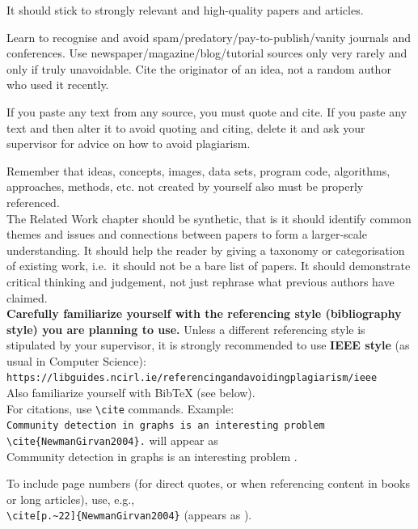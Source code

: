 \documentclass[a4paper,12pt]{Classes/RoboticsLaTeX}
\begin{document}
	It should stick to strongly relevant and high-quality papers and articles. 
	
	Learn to recognise and avoid spam/predatory/pay-to-publish/vanity journals and conferences. Use newspaper/magazine/blog/tutorial sources only very rarely and only if truly unavoidable. Cite the originator of an idea, not a random author who used it recently.
	
	If you paste any text from any source, you must quote and cite. If you paste any text and then alter it to avoid quoting and citing, delete it and ask your supervisor for advice on how to avoid plagiarism.
	
	Remember that ideas, concepts, images, data sets, program code, algorithms, approaches, methods, etc. not created by yourself also must be properly referenced. \\
	
	The Related Work chapter should be synthetic, that is it should identify common themes and issues and connections between papers to form a larger-scale understanding. It should help the reader by giving a taxonomy or categorisation of existing work, i.e.~it should not be a bare list of papers. It should demonstrate critical thinking and judgement, not just rephrase what previous authors have claimed. \\
	
	
	\textbf{Carefully familiarize yourself with the referencing style (bibliography style) you are planning to use.} Unless a different referencing style is stipulated by your supervisor, it is strongly recommended to use \textbf{IEEE style} (as usual in Computer Science):\\ \verb#https://libguides.ncirl.ie/referencingandavoidingplagiarism/ieee#\\
	
	\noindent Also familiarize yourself with BibTeX (see below).\\
	
	\noindent For citations, use \verb#\cite# commands. Example:\\
	\verb#Community detection in graphs is an interesting problem \cite{NewmanGirvan2004}.#
	will appear as\\
	Community detection in graphs is an interesting problem \cite{NewmanGirvan2004}.
	
	\noindent To include page numbers (for direct quotes, or when referencing content in books or long articles), use, e.g.,\\ \noindent \verb#\cite[p.~22]{NewmanGirvan2004}# (appears as \cite[p.~22]{NewmanGirvan2004}).
	
\end{document}
